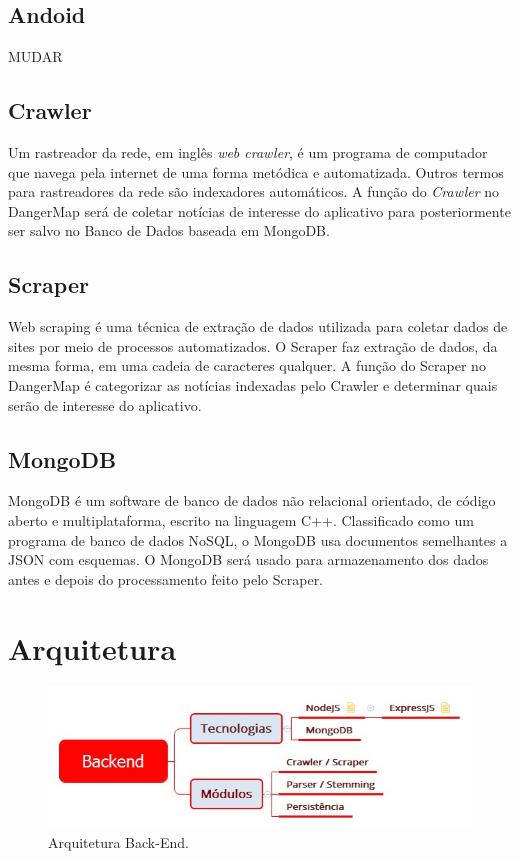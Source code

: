 \documentclass[
	12pt,				%
	openright,			%
	twoside,			%
	a4paper,			%
	english,			%
	french,				%
	spanish,			%
	brazil,				%
	]{abntex2}
\begin{document}
\section*{Andoid }

MUDAR

\section*{Crawler}

Um rastreador da rede, em inglês \textit{web crawler}, é um programa de computador que navega pela internet de uma forma metódica e automatizada. Outros termos para rastreadores da rede são indexadores automáticos. A função do \textit{Crawler} no DangerMap será de coletar notícias de interesse do aplicativo para posteriormente ser salvo no Banco de Dados baseada em MongoDB.

\section*{Scraper}

Web scraping é uma técnica de extração de dados utilizada para coletar dados de sites por meio de processos automatizados. O Scraper faz extração de dados, da mesma forma, em uma cadeia de caracteres qualquer. A função do Scraper no DangerMap é categorizar as notícias indexadas pelo Crawler e determinar quais serão de interesse do aplicativo.

\section*{MongoDB}

MongoDB é um software de banco de dados não relacional orientado, de código aberto e multiplataforma, escrito na linguagem C++. Classificado como um programa de banco de dados NoSQL, o MongoDB usa documentos semelhantes a JSON com esquemas. O MongoDB será usado para armazenamento dos dados antes e depois do processamento feito pelo Scraper.


\chapter{Arquitetura}

\begin{figure}[h]
	\caption{\label{backend_figura}Arquitetura Back-End.}
	\begin{center}
		\includegraphics[scale=0.6]{figuras/arquitetura-backend.jpeg}
	\end{center}
\end{figure}
\end{document}
